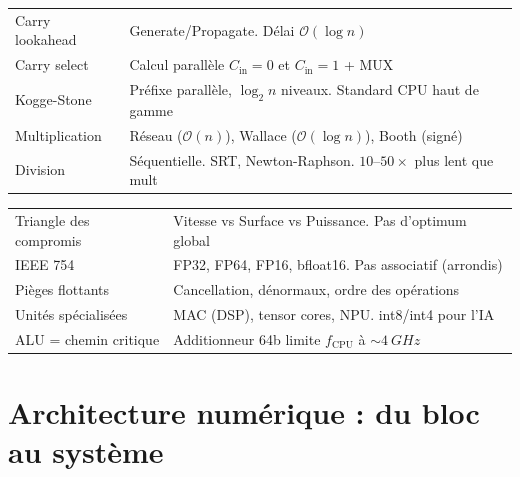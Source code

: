 \documentclass[12pt,a4paper,twoside]{book}
\begin{document}
\begin{approfondissement}[title={\color{white} Résumé --- Approfondissement}]
\begin{center}
\renewcommand{\arraystretch}{1.3}
\begin{tabular}{p{3.5cm}p{9.5cm}}
\toprule
Carry lookahead & Generate/Propagate. Délai $\mathcal{O}(\log n)$ \\
Carry select & Calcul parallèle $C_{\text{in}}=0$ et $C_{\text{in}}=1$ + MUX \\
Kogge-Stone & Préfixe parallèle, $\log_2 n$ niveaux. Standard CPU haut de gamme \\
Multiplication & Réseau ($\mathcal{O}(n)$), Wallace ($\mathcal{O}(\log n)$), Booth (signé) \\
Division & Séquentielle. SRT, Newton-Raphson. $10$--$50\times$ plus lent que mult \\
\bottomrule
\end{tabular}
\end{center}
\end{approfondissement}

\begin{ingenieur}[title={\color{white} Résumé --- Niveau Ingénieur}]
\begin{center}
\renewcommand{\arraystretch}{1.3}
\begin{tabular}{p{3.5cm}p{9.5cm}}
\toprule
Triangle des compromis & Vitesse vs Surface vs Puissance. Pas d'optimum global \\
IEEE 754 & FP32, FP64, FP16, bfloat16. Pas associatif (arrondis) \\
Pièges flottants & Cancellation, dénormaux, ordre des opérations \\
Unités spécialisées & MAC (DSP), tensor cores, NPU. int8/int4 pour l'IA \\
ALU = chemin critique & Additionneur 64b limite $f_{\text{CPU}}$ à $\sim\SI{4}{GHz}$ \\
\bottomrule
\end{tabular}
\end{center}
\end{ingenieur}


\chapter{Architecture numérique : du bloc au système}
\end{document}
